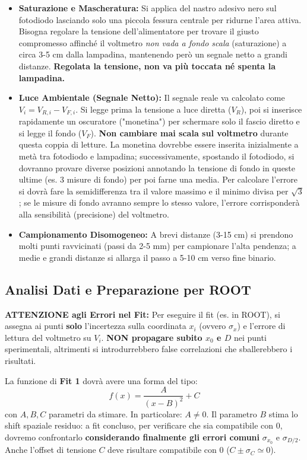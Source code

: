 \documentclass[openany,a4paper,12pt]{book}
\begin{document}
\begin{nota}
\begin{itemize}
    \item \textbf{Saturazione e Mascheratura:} Si applica del nastro adesivo nero sul fotodiodo lasciando solo una piccola fessura centrale per ridurne l'area attiva. Bisogna regolare la tensione dell'alimentatore per trovare il giusto compromesso affinché il voltmetro \textit{non vada a fondo scala} (saturazione) a circa 3-5 cm dalla lampadina, mantenendo però un segnale netto a grandi distanze. \textbf{Regolata la tensione, non va più toccata né spenta la lampadina.}
    \item \textbf{Luce Ambientale (Segnale Netto):} Il segnale reale va calcolato come $V_i = V_{R,i} - V_{F,i}$. Si legge prima la tensione a luce diretta ($V_R$), poi si inserisce rapidamente un oscuratore ("monetina") per schermare solo il fascio diretto e si legge il fondo ($V_F$). \textbf{Non cambiare mai scala sul voltmetro} durante questa coppia di letture. La monetina dovrebbe essere inserita inizialmente a metà tra fotodiodo e lampadina; successivamente, spostando il fotodiodo, si dovranno provare diverse posizioni annotando la tensione di fondo in queste ultime (es. 3 misure di fondo) per poi farne una media. Per calcolare l'errore si dovrà fare la semidifferenza tra il valore massimo e il minimo divisa per $\sqrt{3}$; se le misure di fondo avranno sempre lo stesso valore, l'errore corrisponderà alla sensibilità (precisione) del voltmetro.
    \item \textbf{Campionamento Disomogeneo:} A brevi distanze (3-15 cm) si prendono molti punti ravvicinati (passi da 2-5 mm) per campionare l'alta pendenza; a medie e grandi distanze si allarga il passo a 5-10 cm verso fine binario.
\end{itemize}
\end{nota}

\subsection*{Analisi Dati e Preparazione per ROOT}

\textbf{ATTENZIONE agli Errori nel Fit:} Per eseguire il fit (es. in ROOT), si assegna ai punti \textbf{solo} l'incertezza sulla coordinata $x_i$ (ovvero $\sigma_x$) e l'errore di lettura del voltmetro su $V_i$. \textbf{NON propagare subito $x_0$ e $D$} nei punti sperimentali, altrimenti si introdurrebbero false correlazioni che sballerebbero i risultati.

La funzione di \textbf{Fit 1} dovrà avere una forma del tipo:
\begin{equation}
    f(x) = \frac{A}{(x-B)^2} + C
\end{equation}
con $A, B, C$ parametri da stimare.
In particolare: $A \ne 0$. Il parametro $B$ stima lo shift spaziale residuo: a fit concluso, per verificare che sia compatibile con 0, dovremo confrontarlo \textbf{considerando finalmente gli errori comuni} $\sigma_{x_0}$ e $\sigma_{D/2}$. Anche l'offset di tensione $C$ deve risultare compatibile con 0 ($C \pm \sigma_C \simeq 0$).
\end{document}
